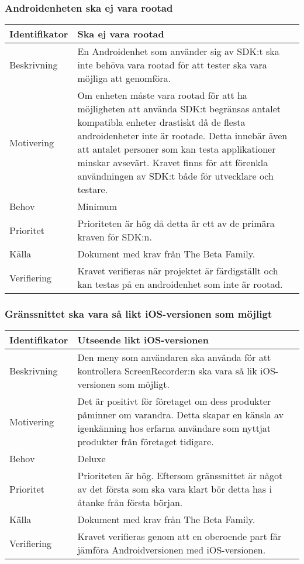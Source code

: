 \subsubsection{Androidenheten ska ej vara rootad}
\begin{tabular}{ | p{65pt} | p{300pt} |}
  \hline
  Identifikator &
  Ska ej vara rootad
  \\ \hline
  Beskrivning & 
  En Androidenhet som använder sig av SDK:t ska inte behöva vara rootad för att tester ska vara möjliga att genomföra.
  \\ \hline
  Motivering &
  Om enheten måste vara rootad för att ha möjligheten att använda SDK:t begränsas antalet kompatibla enheter drastiskt då de flesta androidenheter inte är rootade. Detta innebär även att antalet personer som kan testa applikationer minskar avsevärt. Kravet finns för att förenkla användningen av SDK:t både för utvecklare och testare.
  \\ \hline
  Behov &
  Minimum
  \\ \hline
  Prioritet &
  Prioriteten är hög då detta är ett av de primära kraven för SDK:n.
  \\ \hline
  Källa &
  Dokument med krav från The Beta Family.
  \\ \hline
  Verifiering &
  Kravet verifieras när projektet är färdigställt och kan testas på en androidenhet som inte är rootad.
  \\ \hline
\end{tabular}

\subsubsection{Gränssnittet ska vara så likt iOS-versionen som möjligt}
\begin{tabular}{ | p{65pt} | p{300pt} |}
  \hline
  Identifikator &
  Utseende likt iOS-versionen
  \\ \hline
  Beskrivning & 
  Den meny som användaren ska använda för att kontrollera ScreenRecorder:n ska vara så lik iOS-versionen som möjligt.
  \\ \hline
  Motivering &
  Det är positivt för företaget om dess produkter påminner om varandra. Detta skapar en känsla av igenkänning hos erfarna användare som nyttjat produkter från företaget tidigare.
  \\ \hline
  Behov &
  Deluxe
  \\ \hline
  Prioritet &
  Prioriteten är hög. Eftersom gränssnittet är något av det första som ska vara klart bör detta has i åtanke från första början.
  \\ \hline
  Källa &
  Dokument med krav från The Beta Family.
  \\ \hline
  Verifiering &
  Kravet verifieras genom att en oberoende part får jämföra Androidversionen med iOS-versionen.
  \\ \hline
\end{tabular}

